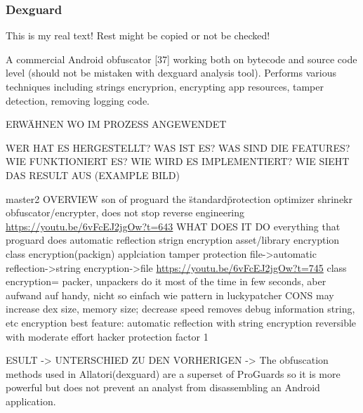 \subsubsection{Dexguard} \label{subsubsection:counter-reengineering-optobf-dexguard}
This is my real text! Rest might be copied or not be checked!


%
A commercial Android obfuscator [37] working both on bytecode and source code level (should not be mistaken with dexguard analysis tool). Performs various techniques including strings encryprion, encrypting app resources, tamper detection, removing logging code.
\cite{kovachevaMaster}
%


ERWÄHNEN WO IM PROZESS ANGEWENDET\newline


WER HAT ES HERGESTELLT? WAS IST ES? WAS SIND DIE FEATURES? WIE FUNKTIONIERT ES? WIE WIRD ES IMPLEMENTIERT? WIE SIEHT DAS RESULT AUS (EXAMPLE BILD)\newline

master2\newline
OVERVIEW\newline
son of proguard\newline
the \"standard\" protection\newline
optimizer\newline
shrinekr\newline
obfuscator/encrypter, does not stop reverse engineering\newline
\url{https://youtu.be/6vFcEJ2jgOw?t=643}\newline
WHAT DOES IT DO\newline
everything that proguard does\newline
automatic reflection\newline
strign encryption\newline
asset/library encryption\newline
class encryption(packign)\newline
applciation tamper protection\newline
file->automatic reflection->string encryption->file\newline
\url{https://youtu.be/6vFcEJ2jgOw?t=745}\newline
class encryption= packer, unpackers do it most of the time in few seconds, aber aufwand auf handy, nicht so einfach wie pattern in luckypatcher\newline
CONS\newline
may increase dex size, memory size; decrease speed\newline
removes debug information\newline
string, etc encryption\newline
best feature: automatic reflection with string encryption\newline
reversible with moderate effort\newline
hacker protection factor 1\newline

ESULT -> UNTERSCHIED ZU DEN VORHERIGEN -> The obfuscation methods used in Allatori(dexguard) are a superset of ProGuards so it is more powerful but does not prevent an analyst from disassembling an Android application.
